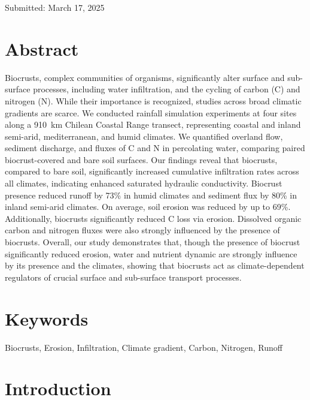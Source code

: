 \vspace{0.5cm}
\begin{center}
  Submitted: March 17, 2025\\
\end{center}
\cleardoublepage

\section*{Abstract} %

Biocrusts, complex communities of organisms, significantly alter surface and sub-surface processes, including water infiltration, and the cycling of carbon (C) and nitrogen (N). While their importance is recognized, studies across broad climatic gradients are scarce. We conducted rainfall simulation experiments at four sites along a \SI{910}{\kilo\meter} Chilean Coastal Range transect, representing coastal and inland semi-arid, mediterranean, and humid climates. We quantified overland flow, sediment discharge, and fluxes of C and N in percolating water, comparing paired biocrust-covered and bare soil surfaces. Our findings reveal that biocrusts, compared to bare soil, significantly increased cumulative infiltration rates across all climates, indicating enhanced saturated hydraulic conductivity. Biocrust presence reduced runoff by 73\% in humid climates and sediment flux by 80\% in inland semi-arid climates. On average, soil erosion was reduced by up to 69\%. Additionally, biocrusts significantly reduced C loss via erosion. Dissolved organic carbon and nitrogen fluxes were also strongly influenced by the presence of biocrusts. Overall, our study demonstrates that, though the presence of biocrust significantly reduced erosion, water and nutrient dynamic are strongly influence by its presence and the climates, showing that biocrusts act as climate-dependent regulators of crucial surface and sub-surface transport processes.

\section*{Keywords}

Biocrusts, Erosion, Infiltration, Climate gradient, Carbon, Nitrogen, Runoff

\section{Introduction}

